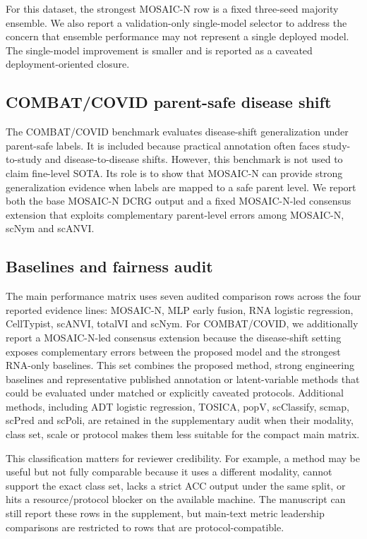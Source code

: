 \documentclass[unnumsec,webpdf,contemporary,large,numbered]{oup-authoring-template}
\begin{document}
For this dataset, the strongest MOSAIC-N row is a fixed three-seed majority ensemble. We also report a validation-only single-model selector to address the concern that ensemble performance may not represent a single deployed model. The single-model improvement is smaller and is reported as a caveated deployment-oriented closure.

\subsection{COMBAT/COVID parent-safe disease shift}

The COMBAT/COVID benchmark evaluates disease-shift generalization under parent-safe labels. It is included because practical annotation often faces study-to-study and disease-to-disease shifts. However, this benchmark is not used to claim fine-level SOTA. Its role is to show that MOSAIC-N can provide strong generalization evidence when labels are mapped to a safe parent level. We report both the base MOSAIC-N DCRG output and a fixed MOSAIC-N-led consensus extension that exploits complementary parent-level errors among MOSAIC-N, scNym and scANVI.

\subsection{Baselines and fairness audit}

The main performance matrix uses seven audited comparison rows across the four reported evidence lines: MOSAIC-N, MLP early fusion, RNA logistic regression, CellTypist, scANVI, totalVI and scNym. For COMBAT/COVID, we additionally report a MOSAIC-N-led consensus extension because the disease-shift setting exposes complementary errors between the proposed model and the strongest RNA-only baselines. This set combines the proposed method, strong engineering baselines and representative published annotation or latent-variable methods that could be evaluated under matched or explicitly caveated protocols. Additional methods, including ADT logistic regression, TOSICA, popV, scClassify, scmap, scPred and scPoli, are retained in the supplementary audit when their modality, class set, scale or protocol makes them less suitable for the compact main matrix.

This classification matters for reviewer credibility. For example, a method may be useful but not fully comparable because it uses a different modality, cannot support the exact class set, lacks a strict ACC output under the same split, or hits a resource/protocol blocker on the available machine. The manuscript can still report these rows in the supplement, but main-text metric leadership comparisons are restricted to rows that are protocol-compatible.
\end{document}

